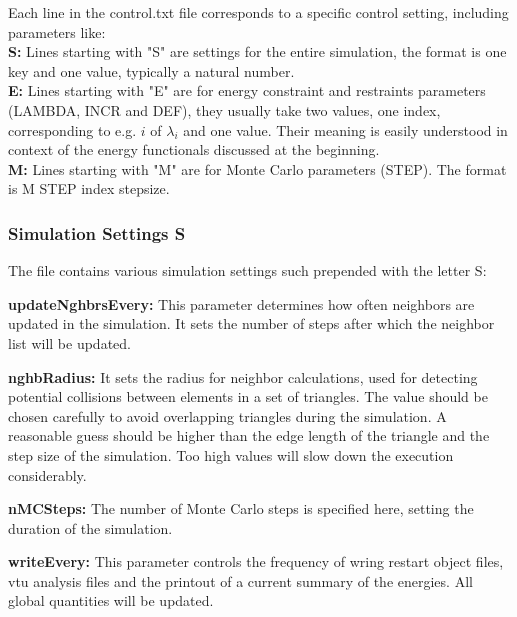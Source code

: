 \documentclass[11pt]{article}
\begin{document}
Each line in the control.txt file corresponds to a specific control setting, including parameters like:\\
\noindent
\textbf{S:} Lines starting with "S" are settings for the entire simulation, the format is one key and one value, typically a natural number.
\\
\noindent
\textbf{E:} Lines starting with "E" are for energy constraint and restraints parameters (LAMBDA, INCR  and DEF), they usually take two values, one index, corresponding to e.g. $i$ of $\lambda_i$ and one value. Their meaning is easily understood in context of the energy functionals discussed at the beginning.
\\
\noindent
\textbf{M:} Lines starting with "M" are for Monte Carlo parameters (STEP). The format is M STEP {index} {stepsize}.
\\

\subsubsection{Simulation Settings S}
\noindent
The file contains various simulation settings such prepended with the letter S:

\noindent
\textbf{updateNghbrsEvery:} This parameter determines how often neighbors are updated in the simulation. It sets the number of steps after which the neighbor list will be updated.

\noindent
\textbf{nghbRadius:} It sets the radius for neighbor calculations, used for detecting potential collisions between elements in a set of triangles. The value should be chosen carefully to avoid overlapping triangles during the simulation. A reasonable guess should be higher than the edge length of the triangle and the step size of the simulation. Too high values will slow down the execution considerably.

\noindent
\textbf{nMCSteps:} The number of Monte Carlo steps is specified here, setting the duration of the simulation.

\noindent
\textbf{writeEvery:} This parameter controls the frequency of wring restart object files, vtu analysis files and the printout of a current summary of the energies. All global quantities will be updated.
\end{document}
